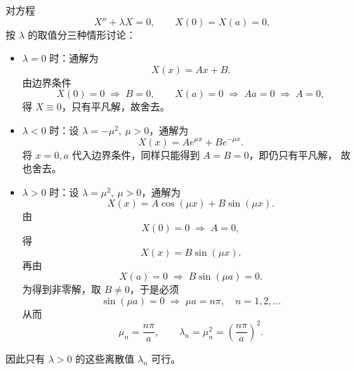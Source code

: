 \begin{dxtips}
    对方程
\[
X''+\lambda X=0,\qquad X(0)=X(a)=0,
\]
按 $\lambda$ 的取值分三种情形讨论：

\begin{itemize}
  \item $\lambda=0$ 时：通解为
  \[
  X(x)=Ax+B.
  \]
  由边界条件
  \[
  X(0)=0 \;\Rightarrow\; B=0,\qquad
  X(a)=0 \;\Rightarrow\; Aa=0 \;\Rightarrow\; A=0,
  \]
  得 $X\equiv 0$，只有平凡解，故舍去。

  \item $\lambda<0$ 时：设 $\lambda=-\mu^2,\ \mu>0$，通解为
  \[
  X(x)=Ae^{\mu x}+Be^{-\mu x}.
  \]
  将 $x=0,a$ 代入边界条件，同样只能得到 $A=B=0$，即仍只有平凡解，
  故也舍去。

  \item $\lambda>0$ 时：设 $\lambda=\mu^2,\ \mu>0$，通解为
  \[
  X(x)=A\cos(\mu x)+B\sin(\mu x).
  \]
  由
  \[
  X(0)=0 \;\Rightarrow\; A=0,
  \]
  得
  \[
  X(x)=B\sin(\mu x).
  \]
  再由
  \[
  X(a)=0 \;\Rightarrow\; B\sin(\mu a)=0.
  \]
  为得到非零解，取 $B\neq 0$，于是必须
  \[
  \sin(\mu a)=0 \;\Rightarrow\; \mu a=n\pi,\quad n=1,2,\dots
  \]
  从而
  \[
  \mu_n=\frac{n\pi}{a},\qquad
  \lambda_n=\mu_n^2=\left(\frac{n\pi}{a}\right)^2.
  \]
\end{itemize}

因此只有 $\lambda>0$ 的这些离散值 $\lambda_n$ 可行。
\end{dxtips}
